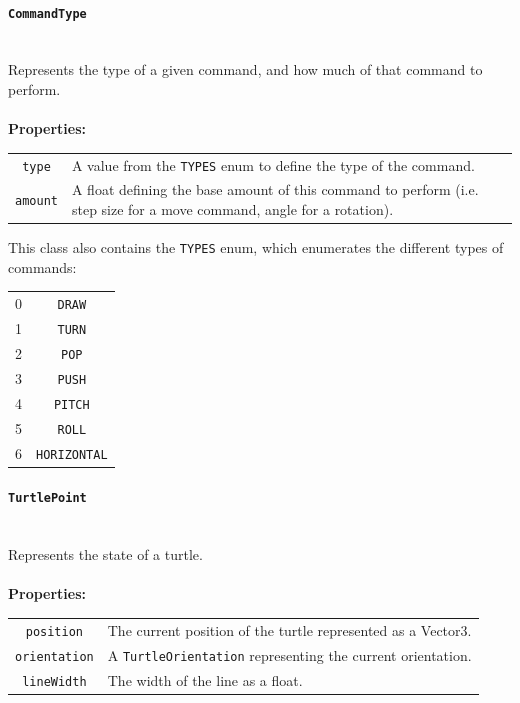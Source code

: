\documentclass[12pt]{article}
\begin{document}
\paragraph{{\large\texttt{CommandType}}}\mbox{} \\
Represents the type of a given command, and how much of that command to perform.\\\\
\textbf{Properties: }
\begin{center}
\begin{tabular}{c p{12cm}}
\texttt{type}& A value from the \texttt{TYPES} enum to define the type of the command.\\
\texttt{amount}& A float defining the base amount of this command to perform (i.e. step size for a move command, angle for a rotation).\\
\end{tabular}
\end{center}
This class also contains the \texttt{TYPES} enum, which enumerates the different types of commands:\\
\begin{center}
\begin{tabular}{c c}
0&\texttt{DRAW}\\
1&\texttt{TURN}\\
2&\texttt{POP}\\
3&\texttt{PUSH}\\
4&\texttt{PITCH}\\
5&\texttt{ROLL}\\
6&\texttt{HORIZONTAL}\\
\end{tabular}
\end{center}


\paragraph{{\large\texttt{TurtlePoint}}}\mbox{} \\
Represents the state of a turtle.\\\\
\textbf{Properties: }
\begin{center}
\begin{tabular}{c p{12cm}}
\texttt{position}& The current position of the turtle represented as a Vector3.\\
\texttt{orientation}& A \texttt{TurtleOrientation} representing the current orientation.\\
\texttt{lineWidth}& The width of the line as a float.\\
\end{tabular}
\end{center}
\end{document}
